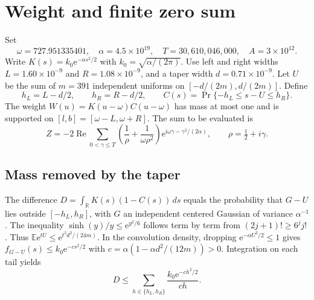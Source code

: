 \documentclass[11pt]{article}
\newcommand{\ee}{\mathrm{e}}
\begin{document}
\clearpage
\section{Weight and finite zero sum}
Set
\[
\omega=727.951335401,\quad \alpha=4.5\times10^{19},\quad
T=30{,}610{,}046{,}000,\quad A=3\times10^{12}.
\]
Write $K(s)=k_0\ee^{-\alpha s^2/2}$ with $k_0=\sqrt{\alpha/(2\pi)}$.
Use left and right widths $L=1.60\times10^{-9}$ and $R=1.08\times10^{-9}$,
and a taper width $d=0.71\times10^{-9}$. Let $U$ be the sum of $m=391$
independent uniforms on $[-d/(2m),d/(2m)]$. Define
\[
h_L=L-d/2,\qquad h_R=R-d/2,\qquad
C(s)=\Pr\{-h_L\le s-U\le h_R\}.
\]
The weight $W(u)=K(u-\omega)C(u-\omega)$ has mass at most one
and is supported on $[l,b]=[\omega-L,\omega+R]$.
The sum to be evaluated is
\begin{equation}\label{eq:signal}
Z=-2\operatorname{Re}\sum_{0<\gamma\le T}
  \left(\frac{1}{\rho}+\frac{1}{\omega\rho^2}\right)
  \ee^{i\omega\gamma-\gamma^2/(2\alpha)},
\qquad \rho=\tfrac12+i\gamma .
\end{equation}

\subsection{Mass removed by the taper}
The difference $D=\int_{\mathbb R}K(s)(1-C(s))\,ds$ equals the
probability that $G-U$ lies outside $[-h_L,h_R]$, with $G$ an
independent centered Gaussian of variance $\alpha^{-1}$.
The inequality $\sinh(y)/y\le\ee^{y^2/6}$ follows term by term from
$(2j+1)!\ge6^j j!$. Thus $\mathbb{E}\ee^{tU}\le\ee^{t^2d^2/(24m)}$.
In the convolution density, dropping $\ee^{-\alpha U^2/2}\le1$
gives $f_{G-U}(s)\le k_0\ee^{-cs^2/2}$ with
$c=\alpha(1-\alpha d^2/(12m))>0$. Integration on each tail yields
\begin{equation}\label{eq:mass}
D\le \sum_{h\in\{h_L,h_R\}}\frac{k_0\ee^{-ch^2/2}}{ch}.
\end{equation}
\end{document}

